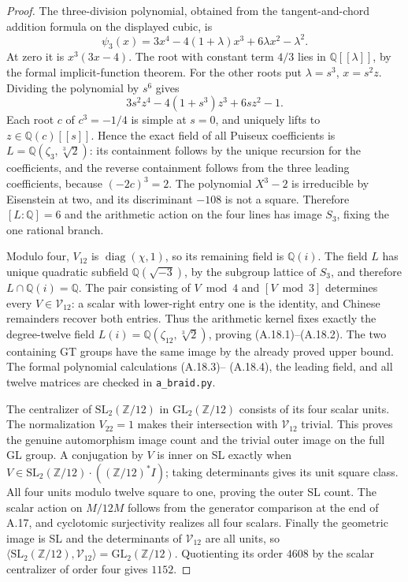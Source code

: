 \begin{proof}
The three-division polynomial, obtained from the tangent-and-chord
addition formula on the displayed cubic, is
\[
 \psi_3(x)=3x^4-4(1+\lambda)x^3+6\lambda x^2-\lambda^2. \tag{A.18.3}
\]
At zero it is $x^3(3x-4)$. The root with constant term $4/3$
lies in $\mathbb Q[[\lambda]]$, by the formal implicit-function
theorem. For the other roots put $\lambda=s^3$, $x=s^2z$.
Dividing the polynomial by $s^6$ gives
\[
 3s^2z^4-4(1+s^3)z^3+6sz^2-1.                    \tag{A.18.4}
\]
Each root $c$ of $c^3=-1/4$ is simple at $s=0$, and uniquely
lifts to $z\in\mathbb Q(c)[[s]]$. Hence the exact field of all
Puiseux coefficients is
$L=\mathbb Q(\zeta_3,\sqrt[3]{2})$: its containment follows by
the unique recursion for the coefficients, and the reverse
containment follows from the three leading coefficients, because
$( -2c)^3=2$. The polynomial $X^3-2$ is irreducible by Eisenstein
at two, and its discriminant $-108$ is not a square. Therefore
$[L:\mathbb Q]=6$ and the arithmetic action on the four lines
has image $S_3$, fixing the one rational branch.

Modulo four, $V_{12}$ is $\operatorname{diag}(\chi,1)$, so its
remaining field is $\mathbb Q(i)$. The field $L$ has unique
quadratic subfield $\mathbb Q(\sqrt{-3})$, by the subgroup lattice
of $S_3$, and therefore $L\cap\mathbb Q(i)=\mathbb Q$.
The pair consisting of $V\bmod4$ and $[V\bmod3]$ determines
every $V\in\mathcal V_{12}$: a scalar with lower-right entry one
is the identity, and Chinese remainders recover both entries.
Thus the arithmetic kernel fixes exactly the degree-twelve field
$L(i)=\mathbb Q(\zeta_{12},\sqrt[3]{2})$, proving (A.18.1)--(A.18.2).
The two containing GT groups have the same image by the already
proved upper bound. The formal polynomial calculations (A.18.3)--
(A.18.4), the leading field, and all twelve matrices are checked
in \texttt{a\_braid.py}.

The centralizer of $\mathrm{SL}_2(\mathbb Z/12)$ in
$\mathrm{GL}_2(\mathbb Z/12)$ consists of its four scalar units.
The normalization $V_{22}=1$ makes their intersection with
$\mathcal V_{12}$ trivial. This proves the genuine automorphism
image count and the trivial outer image on the full GL group.
A conjugation by $V$ is inner on SL exactly when
$V\in\mathrm{SL}_2(\mathbb Z/12)\cdot
((\mathbb Z/12)^*I)$; taking determinants gives its unit square
class. All four units modulo twelve square to one, proving the
outer SL count. The scalar action on $M/12M$ follows from the
generator comparison at the end of A.17, and cyclotomic
surjectivity realizes all four scalars. Finally the geometric
image is SL and the determinants of $\mathcal V_{12}$ are all
units, so $\langle\mathrm{SL}_2(\mathbb Z/12),\mathcal V_{12}\rangle
=\mathrm{GL}_2(\mathbb Z/12)$. Quotienting its order $4608$ by
the scalar centralizer of order four gives $1152$.


\end{proof}
